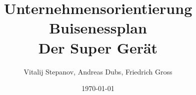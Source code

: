 \documentclass[12pt,a4paper]{scrartcl}
\begin{document}
\title{Unternehmensorientierung\\
	  Buisenessplan\\
	  Der Super Gerät}
\author{Vitalij Stepanov, Andreas Dubs, Friedrich Gross}
\date{\today}
\maketitle
\newpage
\tableofcontents
\newpage
\pagestyle{myheadings}
 









%
\end{document}
